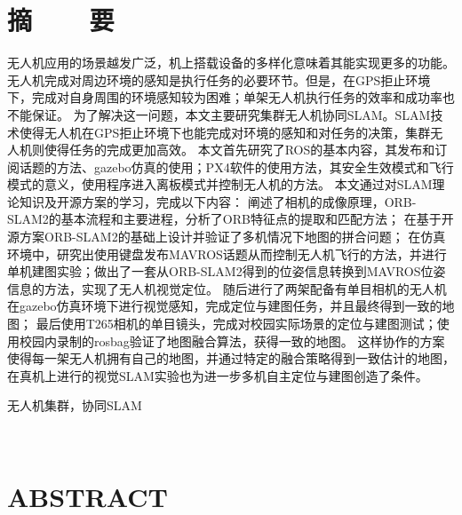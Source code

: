 

\renewcommand{\baselinestretch}{1.5}
\fontsize{12pt}{13pt} \selectfont

\chapter*{摘~~~~要}

\vspace{1em}


无人机应用的场景越发广泛，机上搭载设备的多样化意味着其能实现更多的功能。
无人机完成对周边环境的感知是执行任务的必要环节。但是，在GPS拒止环境下，完成对自身周围的环境感知较为困难；单架无人机执行任务的效率和成功率也不能保证。
为了解决这一问题，本文主要研究集群无人机协同SLAM。SLAM技术使得无人机在GPS拒止环境下也能完成对环境的感知和对任务的决策，集群无人机则使得任务的完成更加高效。
本文首先研究了ROS的基本内容，其发布和订阅话题的方法、gazebo仿真的使用；PX4软件的使用方法，其安全生效模式和飞行模式的意义，使用程序进入离板模式并控制无人机的方法。
本文通过对SLAM理论知识及开源方案的学习，完成以下内容：
阐述了相机的成像原理，ORB-SLAM2的基本流程和主要进程，分析了ORB特征点的提取和匹配方法；
在基于开源方案ORB-SLAM2的基础上设计并验证了多机情况下地图的拼合问题；
在仿真环境中，研究出使用键盘发布MAVROS话题从而控制无人机飞行的方法，并进行单机建图实验；做出了一套从ORB-SLAM2得到的位姿信息转换到MAVROS位姿信息的方法，实现了无人机视觉定位。
随后进行了两架配备有单目相机的无人机在gazebo仿真环境下进行视觉感知，完成定位与建图任务，并且最终得到一致的地图；
最后使用T265相机的单目镜头，完成对校园实际场景的定位与建图测试；使用校园内录制的rosbag验证了地图融合算法，获得一致的地图。
这样协作的方案使得每一架无人机拥有自己的地图，并通过特定的融合策略得到一致估计的地图，在真机上进行的视觉SLAM实验也为进一步多机自主定位与建图创造了条件。

\vspace{0.1in}
 无人机集群，协同SLAM


﻿﻿


\chapter*{ABSTRACT}
\noindent 
\vspace{1em}

